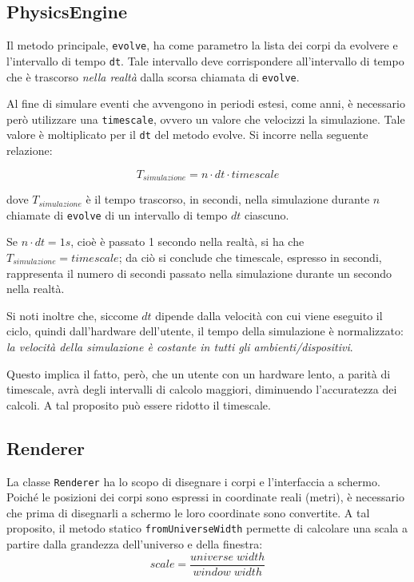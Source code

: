 \documentclass{article}
\begin{document}
\subsection{PhysicsEngine}
\label{physics_engine}
Il metodo principale, \verb|evolve|, ha come parametro la lista dei corpi da evolvere e l'intervallo di tempo \verb|dt|. Tale intervallo deve corrispondere all'intervallo di tempo che è trascorso \textit{nella realtà} dalla scorsa chiamata di \verb|evolve|.

Al fine di simulare eventi che avvengono in periodi estesi, come anni, è necessario però utilizzare una \verb|timescale|, ovvero un valore che velocizzi la simulazione. Tale valore è moltiplicato per il \verb|dt| del metodo evolve. Si incorre nella seguente relazione:

\begin{equation*}
    T_{simulazione} = n \cdot dt \cdot timescale
\end{equation*}

dove $T_{simulazione}$ è il tempo trascorso, in secondi, nella simulazione durante $n$ chiamate di \verb|evolve| di un intervallo di tempo $dt$ ciascuno.

 Se $n \cdot dt = 1 s$, cioè è passato 1 secondo nella realtà, si ha che $T_{simulazione} = timescale$; da ciò si conclude che timescale, espresso in secondi, rappresenta il numero di secondi passato nella simulazione durante un secondo nella realtà.

Si noti inoltre che, siccome $dt$ dipende dalla velocità con cui viene eseguito il ciclo, quindi dall'hardware dell'utente, il tempo della simulazione è normalizzato: \textit{la velocità della simulazione è costante in tutti gli ambienti/dispositivi}.

Questo implica il fatto, però, che un utente con un hardware lento, a parità di timescale, avrà degli intervalli di calcolo maggiori, diminuendo l'accuratezza dei calcoli. A tal proposito può essere ridotto il timescale.

\subsection{Renderer}
La classe \verb|Renderer| ha lo scopo di disegnare i corpi e l'interfaccia a schermo. Poiché le posizioni dei corpi sono espressi in coordinate reali (metri), è necessario che prima di disegnarli a schermo le loro coordinate sono convertite. A tal proposito, il metodo statico \verb|fromUniverseWidth| permette di calcolare una scala a partire dalla grandezza dell'universo e della finestra:
\begin{equation*}
    scale = \frac{universe\;width}{window\;width}
\end{equation*}
\end{document}
